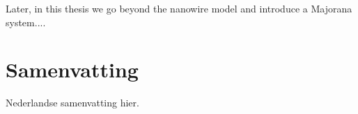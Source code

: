 Later, in this thesis we go beyond the nanowire model and introduce a Majorana system.... 

\chapter*{Samenvatting}
{

Nederlandse samenvatting hier.

}